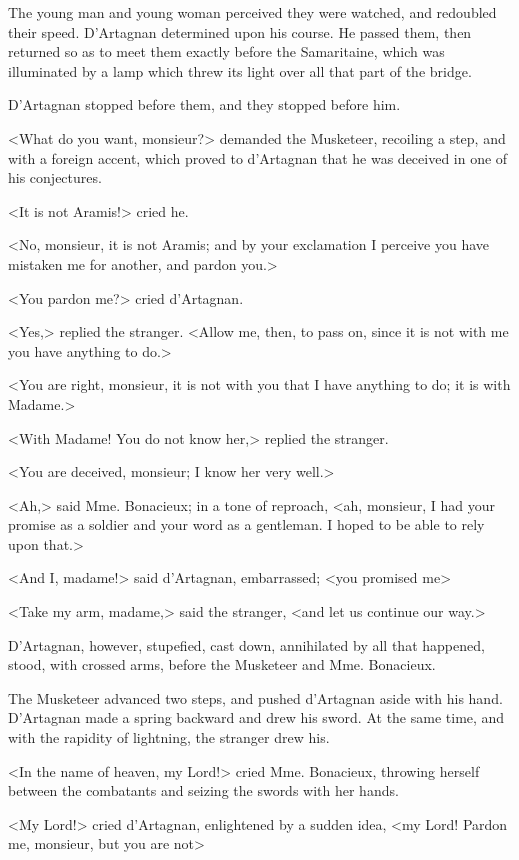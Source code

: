The young man and young woman perceived they were watched, and redoubled their speed. D'Artagnan determined upon his course. He passed them, then returned so as to meet them exactly before the Samaritaine, which was illuminated by a lamp which threw its light over all that part of the bridge. 

D'Artagnan stopped before them, and they stopped before him. 

<What do you want, monsieur?> demanded the Musketeer, recoiling a step, and with a foreign accent, which proved to d'Artagnan that he was deceived in one of his conjectures. 

<It is not Aramis!> cried he. 

<No, monsieur, it is not Aramis; and by your exclamation I perceive you have mistaken me for another, and pardon you.> 

<You pardon me?> cried d'Artagnan. 

<Yes,> replied the stranger. <Allow me, then, to pass on, since it is not with me you have anything to do.> 

<You are right, monsieur, it is not with you that I have anything to do; it is with Madame.> 

<With Madame! You do not know her,> replied the stranger. 

<You are deceived, monsieur; I know her very well.> 

<Ah,> said Mme. Bonacieux; in a tone of reproach, <ah, monsieur, I had your promise as a soldier and your word as a gentleman. I hoped to be able to rely upon that.> 

<And I, madame!> said d'Artagnan, embarrassed; <you promised me\longdash> 

<Take my arm, madame,> said the stranger, <and let us continue our way.> 

D'Artagnan, however, stupefied, cast down, annihilated by all that happened, stood, with crossed arms, before the Musketeer and Mme. Bonacieux. 

The Musketeer advanced two steps, and pushed d'Artagnan aside with his hand. D'Artagnan made a spring backward and drew his sword. At the same time, and with the rapidity of lightning, the stranger drew his. 

<In the name of heaven, my Lord!> cried Mme. Bonacieux, throwing herself between the combatants and seizing the swords with her hands. 

<My Lord!> cried d'Artagnan, enlightened by a sudden idea, <my Lord! Pardon me, monsieur, but you are not\longdash> 

